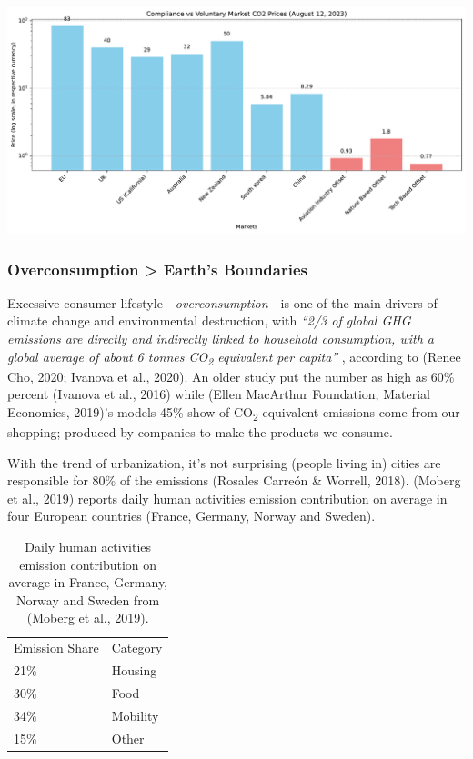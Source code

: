 \documentclass[
  letterpaper,
  DIV=11,
  numbers=noendperiod]{scrartcl}
\begin{document}
\includegraphics{_thesis_files/figure-pdf/cell-16-output-1.pdf}

\subsubsection{Overconsumption \textgreater{} Earth's
Boundaries}\label{overconsumption-earths-boundaries}

Excessive consumer lifestyle - \emph{overconsumption} - is one of the
main drivers of climate change and environmental destruction, with
\emph{``2/3 of global GHG emissions are directly and indirectly linked
to household consumption, with a global average of about 6 tonnes
CO\textsubscript{2} equivalent per capita''} , according to (Renee Cho,
2020; Ivanova et al., 2020). An older study put the number as high as
60\% percent (Ivanova et al., 2016) while (Ellen MacArthur Foundation,
Material Economics, 2019)'s models 45\% show of CO\textsubscript{2}
equivalent emissions come from our shopping; produced by companies to
make the products we consume.

With the trend of urbanization, it's not surprising (people living in)
cities are responsible for 80\% of the emissions (Rosales Carreón \&
Worrell, 2018). (Moberg et al., 2019) reports daily human activities
emission contribution on average in four European countries (France,
Germany, Norway and Sweden).

\begin{longtable}[]{@{}ll@{}}
\caption{Daily human activities emission contribution on average in
France, Germany, Norway and Sweden from (Moberg et al.,
2019).}\tabularnewline
\toprule\noalign{}
\endfirsthead
\endhead
\bottomrule\noalign{}
\endlastfoot
Emission Share & Category \\
21\% & Housing \\
30\% & Food \\
34\% & Mobility \\
15\% & Other \\
\end{longtable}
\end{document}
